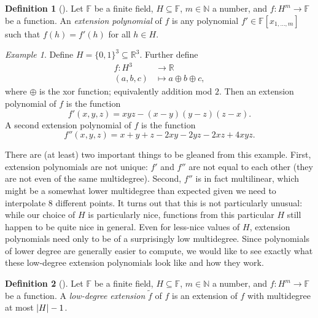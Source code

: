 \documentclass[english,12pt]{reedthesis}
\theoremstyle{plain}
\theoremstyle{definition}
\newtheorem{defn}[defn]{Definition}
\theoremstyle{remark}
\newtheorem{example}{Example}[thm]
\DeclarePairedDelimiter{\abs}{\lvert}{\rvert}
\begin{document}
\begin{defn}[{\cite[8]{AW09}}]\label{def:ext-poly}
  Let $\mathbb{F}$ be a finite field, $H \subseteq \mathbb{F}$, $m \in \mathbb{N}$ a number, and
  $f\colon H^{m} \rightarrow \mathbb{F}$ be a function. An \emph{extension polynomial} of
  $f$ is any polynomial $f' \in \mathbb{F}[x_{1, \ldots, m}]$ such that $f(h) = f'(h)$
  for all $h \in H$.
\end{defn}

\begin{example}
  Define $H = \{0, 1\}^{3} \subseteq \mathbb{R}^{3}$. Further define
  \begin{align*}
    f\colon H^{3} &\rightarrow \mathbb{R} \\
    (a, b, c) &\mapsto a \oplus b \oplus c,
  \end{align*}
  where $\oplus$ is the xor function; equivalently addition mod $2$. Then an
  extension polynomial of $f$ is the function
  \begin{equation*}
    f'(x, y, z) = xyz - (x - y)(y - z)(z - x).
  \end{equation*}
  A second extension polynomial of $f$ is the function
  \begin{equation*}
    f''(x, y, z) = x + y + z - 2xy - 2yz - 2xz + 4xyz.
  \end{equation*}
\end{example}

There are (at least) two important things to be gleaned from this example.
First, extension polynomials are not unique: $f'$ and $f''$ are not equal to
each other (they are not even of the same multidegree). Second, $f''$ is in fact
multilinear, which might be a somewhat lower multidegree than expected given we
need to interpolate 8 different points. It turns out that this is not
particularly unusual: while our choice of $H$ is particularly nice, functions
from this particular $H$ still happen to be quite nice in general. Even for
less-nice values of $H$, extension polynomials need only to be of a surprisingly
low multidegree. Since polynomials of lower degree are generally easier to
compute, we would like to see exactly what these low-degree extension
polynomials look like and how they work.

\begin{defn}[{\cite[]{CFGS22}}]\label{def:low-deg-ext}
  Let $\mathbb{F}$ be a finite field, $H \subseteq \mathbb{F}$, $m \in \mathbb{N}$ a number, and
  $f\colon H^{m} \rightarrow \mathbb{F}$ be a function. A \emph{low-degree extension}
  $\tilde{f}$ of $f$ is an extension of $f$ with multidegree at most
  $\abs{H} - 1$.
\end{defn}
\end{document}
